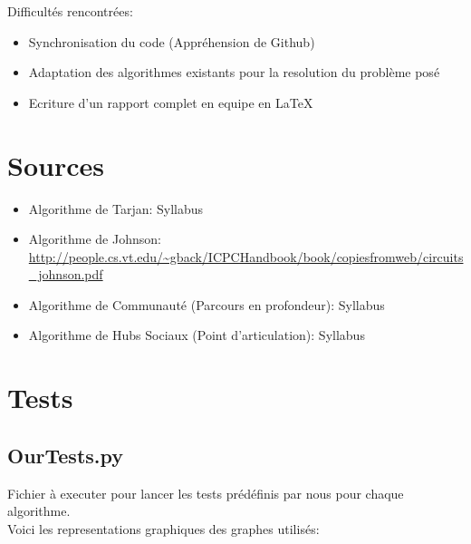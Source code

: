 \documentclass[12pt, oneside]{article}
\begin{document}
Difficultés rencontrées:
\begin{itemize}
\item Synchronisation du code (Appréhension de Github)
\item Adaptation des algorithmes existants pour la resolution du problème posé
\item Ecriture d'un rapport complet en equipe en LaTeX
\end{itemize}
\section{Sources}
\begin{itemize}
\item Algorithme de Tarjan: Syllabus
\item Algorithme de Johnson: \url{http://people.cs.vt.edu/~gback/ICPCHandbook/book/copiesfromweb/circuits\_johnson.pdf}
\item Algorithme de Communauté (Parcours en profondeur): Syllabus
\item Algorithme de Hubs Sociaux (Point d'articulation): Syllabus
\end{itemize}

\section{Tests}
\subsection{OurTests.py}
Fichier à executer pour lancer les tests prédéfinis par nous pour chaque algorithme.\\
Voici les representations graphiques des graphes utilisés:
\end{document}
